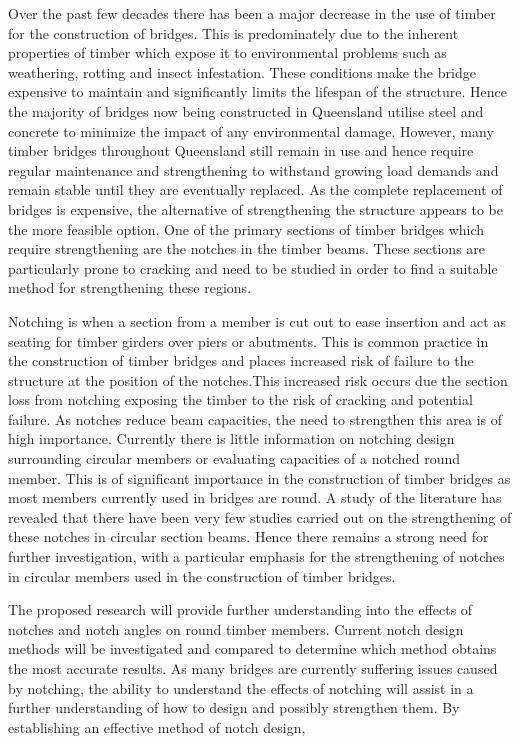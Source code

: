 \documentclass[11pt,a4paper]{article}
\numberwithin{equation}{subsection}
\begin{document}
    \noindent
    Over the past few decades there has been a major decrease in the use of timber for the construction of bridges. This is predominately due to the inherent properties of timber which expose it to environmental problems such as weathering, rotting and insect infestation. These conditions make the bridge expensive to maintain and significantly limits the lifespan of the structure.  Hence the majority of bridges now being constructed in Queensland utilise steel and concrete to minimize the impact of any environmental damage. However, many timber bridges throughout Queensland still remain in use and hence require regular maintenance and strengthening to withstand growing load demands and remain stable until they are eventually replaced. As the complete replacement of bridges is expensive, the alternative of strengthening the structure appears to be the more feasible option. One of the primary sections of timber bridges which require strengthening are the notches in the timber beams. These sections are particularly prone to cracking and need to be studied in order to find a suitable method for strengthening these regions.
	
	\vspace*{\baselineskip}
	
	\noindent
     Notching is when a section from a member is cut out to ease insertion and act as seating for timber girders over piers or abutments. This is common practice in the construction of timber bridges and places increased risk of failure to the structure at the position of the notches.This increased risk occurs due the section loss from notching exposing the timber to the risk of cracking and potential failure. As notches reduce beam capacities, the need to strengthen this area is of high importance. Currently there is little information on notching design surrounding circular members or evaluating capacities of a notched round member. This is of significant importance in the construction of timber bridges as most members currently used in bridges are round. A study of the literature has revealed that there have been very few studies carried out on the strengthening of these notches in circular section beams. Hence there remains a strong need for further investigation, with a particular emphasis for the strengthening of notches in circular members used in the construction of timber bridges. 
	
	\vspace*{\baselineskip}
	
	\noindent
    The proposed research will provide further understanding into the effects of notches and notch angles on round timber members. Current notch design methods will be investigated and compared to determine which method obtains the most accurate results. As many bridges are currently suffering issues caused by notching, the ability to understand the effects of notching will assist in a further understanding of how to design and possibly strengthen them. By establishing an effective method of notch design, 
	
\end{document}

